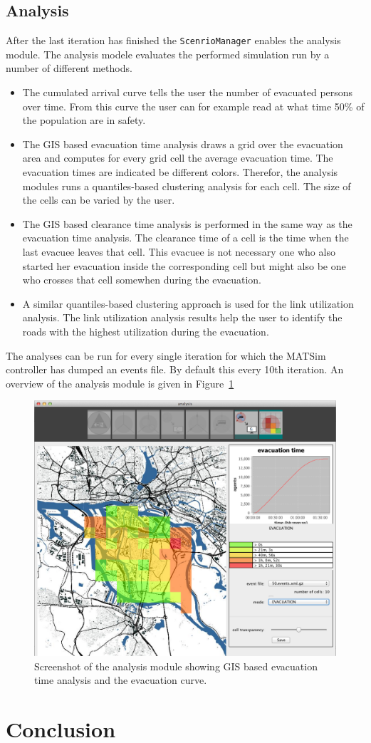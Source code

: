 \subsection{Analysis}
After the last iteration has finished the \lstinline+ScenrioManager+ enables the analysis module. The analysis modele evaluates the performed simulation run by a number of different methods. 
\begin{itemize}
\item The cumulated arrival curve tells the user the number of evacuated persons over time. From this curve the user can for example read at what time 50\% of the population are in safety.
\item The GIS based evacuation time analysis draws a grid over the evacuation area and computes for every grid cell the average evacuation time. The evacuation times are indicated be different colors. Therefor, the analysis modules runs a quantiles-based clustering analysis for each cell. The size of the cells can be varied  by the user.
\item The GIS based clearance time analysis is performed in the same way as the evacuation time  analysis. The clearance time of a cell is the time when the last evacuee leaves that cell. This evacuee is not necessary one who also started her evacuation inside the corresponding cell but might also be one who crosses that cell somewhen during the evacuation.
\item A similar quantiles-based clustering approach is used for the link utilization analysis. The link utilization analysis results help the user to identify the roads with the highest utilization during the evacuation.
\end{itemize}
The analyses can be run for every single iteration for which the MATSim controller has dumped an events file. By default this every 10th iteration. An overview of the analysis module is given in Figure~\ref{chap:evac:fig:analysis}
\begin{figure}
\includegraphics[width=1\textwidth]{extending/figures/Evacuation/it50_evac_time}
\caption{Screenshot of the analysis module showing GIS based evacuation time analysis and the evacuation curve.}\label{chap:evac:fig:analysis}
\end{figure}

\section{Conclusion}\label{grips:outlook}
